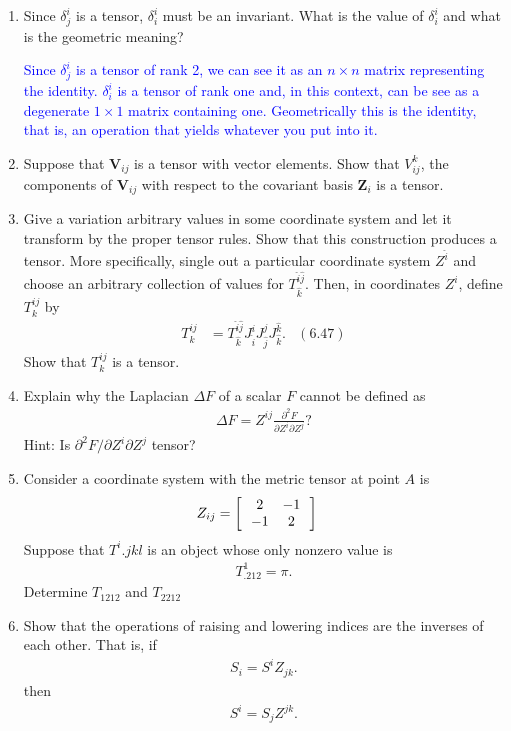 \documentclass[12pt,a4paper]{report}
\newcommand{\BLUE}[1]{\textcolor{blue}{#1}}
\newcommand{\VK}[1]{\textbf{#1}}
\begin{document}
\begin{enumerate}[label=\textbf{\arabic*.}]
\item Since $\delta^i_j$ is a tensor, $\delta^i_i$ must be an invariant.  What is the value of $\delta^i_i$ and what is the geometric meaning?

\BLUE{Since $\delta^i_j$ is a tensor of rank 2, we can see it as an $n\times n$ matrix representing the identity.  $\delta^i_i$ is a tensor of rank one and, in this context, can be see as a degenerate $1 \times 1$ matrix containing one.  Geometrically this is the identity, that is, an operation that yields whatever you put into it.
}

\item Suppose that $\VK{V}_{ij}$ is a tensor with vector elements.  Show that $V^k_{ij}$, the components of $\VK{V}_{ij}$ with respect to the covariant basis $\VK{Z}_i$ is a tensor.

\item Give a variation arbitrary values in some coordinate system and let it transform by the proper tensor rules.  Show that this construction produces a tensor.  More specifically, single out a particular coordinate system $Z^{\hat{i}}$ and choose an arbitrary collection of values for $T^{{\hat{i}}{\hat{j}}}_{\hat{k}}$.  Then, in coordinates $Z^i$, define $T^{ij}_k$ by 
\begin{align*}
	T^{ij}_k&=T^{{\hat{i}}{\hat{j}}}_{\hat{k}} J^i_{\hat{i}}J^j_{\hat{j}}J^{\hat{k}}_{\hat{k}}. & (6.47)
\end{align*}Show that $T^{ij}_k$ is a tensor.

\item Explain why the Laplacian $\Delta F$ of a scalar $F$ cannot be defined as 
\begin{align*}
	\Delta F = Z^{ij} \frac{\partial^2 F}{\partial Z^i\partial Z^j}?
\end{align*}Hint: Is $\partial^2 F/\partial Z^i\partial Z^j$ tensor?

\item Consider a coordinate system with the metric tensor at point $A$ is 
\begin{align*}
	Z_{ij} &= \left [\,  \begin{array}{c c} 2&-1 \\ -1 & 2 \end{array}  \,\right ]
\end{align*}Suppose that $T^{i}{.jkl}$ is an object whose only nonzero value is 
\begin{align*}
	T^1_{.212}= \pi.
\end{align*}Determine $T_{1212}$ and $T_{2212}$

\item Show that the operations of raising and lowering indices are the inverses of each other.  That is, if 
\begin{align*}
	S_i = S^i Z_{jk}.
\end{align*}then
\begin{align*}
	S^i = S_jZ^{jk}.
\end{align*}


\end{enumerate}
\end{document}
